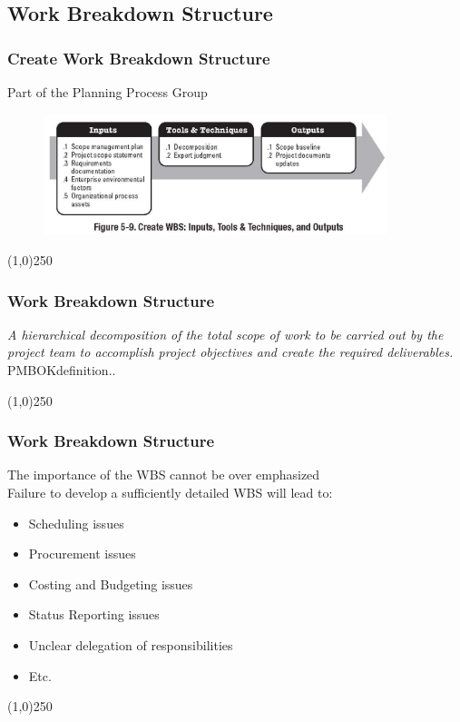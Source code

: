 \subsection{Work Breakdown Structure}


\begin{frame}
\frametitle{Create Work Breakdown Structure}{Part of the Planning Process Group}
\begin{figure}
	\centering
		\includegraphics[width = 10cm]{images/Fig5-9.jpg}
	\label{fig:5-9}
\end{figure}
\end{frame}\begin{center}\line(1,0){250}\end{center}



\begin{frame}
\frametitle{Work Breakdown Structure}
\emph{A hierarchical decomposition of the total scope of work to be carried out by the project team to accomplish project objectives and create the required deliverables.}\\
\hspace{2cm} PMBOK\textregistered definition.. %
\end{frame}\begin{center}\line(1,0){250}\end{center}



\begin{frame}
\frametitle{Work Breakdown Structure}
The importance of the WBS cannot be over emphasized\\
Failure to develop a sufficiently detailed WBS will lead to:\\
\begin{itemize}
	\item Scheduling issues
	\item Procurement issues
	\item Costing and Budgeting issues
	\item Status Reporting issues
	\item Unclear delegation of responsibilities
	\item Etc.
\end{itemize}
\end{frame}\begin{center}\line(1,0){250}\end{center}



